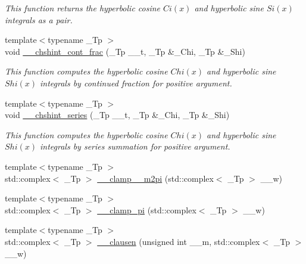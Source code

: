 \begin{DoxyCompactItemize}
\begin{DoxyCompactList}\small\item\em This function returns the hyperbolic cosine $ Ci(x) $ and hyperbolic sine $ Si(x) $ integrals as a pair. \end{DoxyCompactList}\item 
{\footnotesize template$<$typename \+\_\+\+Tp $>$ }\\void \hyperlink{namespacestd_1_1____detail_a07da2303d36d77bfad393a7b8ebdf686}{\+\_\+\+\_\+chshint\+\_\+cont\+\_\+frac} (\+\_\+\+Tp \+\_\+\+\_\+t, \+\_\+\+Tp \&\+\_\+\+Chi, \+\_\+\+Tp \&\+\_\+\+Shi)
\begin{DoxyCompactList}\small\item\em This function computes the hyperbolic cosine $ Chi(x) $ and hyperbolic sine $ Shi(x) $ integrals by continued fraction for positive argument. \end{DoxyCompactList}\item 
{\footnotesize template$<$typename \+\_\+\+Tp $>$ }\\void \hyperlink{namespacestd_1_1____detail_a16055b6e4baa35ffe5c6d9495d9d0158}{\+\_\+\+\_\+chshint\+\_\+series} (\+\_\+\+Tp \+\_\+\+\_\+t, \+\_\+\+Tp \&\+\_\+\+Chi, \+\_\+\+Tp \&\+\_\+\+Shi)
\begin{DoxyCompactList}\small\item\em This function computes the hyperbolic cosine $ Chi(x) $ and hyperbolic sine $ Shi(x) $ integrals by series summation for positive argument. \end{DoxyCompactList}\item 
{\footnotesize template$<$typename \+\_\+\+Tp $>$ }\\std\+::complex$<$ \+\_\+\+Tp $>$ \hyperlink{namespacestd_1_1____detail_a49702394cf9b45acfa5b84f232078a9b}{\+\_\+\+\_\+clamp\+\_\+\_\+m2pi} (std\+::complex$<$ \+\_\+\+Tp $>$ \+\_\+\+\_\+w)
\item 
{\footnotesize template$<$typename \+\_\+\+Tp $>$ }\\std\+::complex$<$ \+\_\+\+Tp $>$ \hyperlink{namespacestd_1_1____detail_afc1fa8ae4623bdc71b3bf21671f68e38}{\+\_\+\+\_\+clamp\+\_\+pi} (std\+::complex$<$ \+\_\+\+Tp $>$ \+\_\+\+\_\+w)
\item 
{\footnotesize template$<$typename \+\_\+\+Tp $>$ }\\std\+::complex$<$ \+\_\+\+Tp $>$ \hyperlink{namespacestd_1_1____detail_a260f2c50d0164a55dab6a95217ced893}{\+\_\+\+\_\+clausen} (unsigned int \+\_\+\+\_\+m, std\+::complex$<$ \+\_\+\+Tp $>$ \+\_\+\+\_\+w)
\item 

\end{DoxyCompactItemize}
